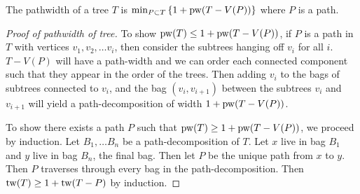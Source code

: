 \begin{theorem}
	The pathwidth of a tree \(T\) is \(\min_{P \subset T} \left\lbrace 1 + \operatorname{pw}(T - V(P))\right\rbrace \) where \(P\) is a path.
\end{theorem}

\begin{proof}[Proof of pathwidth of tree]
	To show \(\operatorname{pw}(T) \leq 1 + \operatorname{pw}(T - V(P))\), if \(P\) is a path in \(T\) with vertices \(v_1, v_2, \ldots v_i\), then consider the subtrees hanging off \(v_i\) for all \(i\). \(T - V(P)\) will have a path-width and we can order each connected component such that they appear in the order of the trees. Then adding \(v_i\) to the bags of subtrees connected to \(v_i\), and the bag \((v_i, v_{i+1})\) between the subtrees \(v_i\) and \(v_{i + 1}\) will yield a path-decomposition of width \(1 + \operatorname{pw}(T - V(P))\).
	\par
	To show there exists a path \(P\) such that \(\operatorname{pw}(T) \geq 1 + \operatorname{pw}(T - V(P))\), we proceed by induction. Let \(B_1, \ldots B_n\) be a path-decomposition of \(T\). Let \(x\) live in bag \(B_1\) and \(y\) live in bag \(B_n\), the final bag. Then let \(P\) be the unique path from \(x\) to \(y\). Then \(P\) traverses through every bag in the path-decomposition. Then \(\operatorname{tw}(T) \geq 1 + \operatorname{tw}(T - P)\) by induction.
\end{proof}
